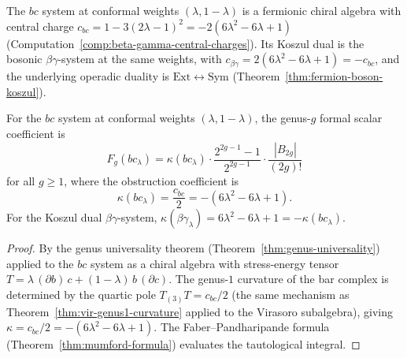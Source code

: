 The $bc$ system at conformal weights $(\lambda, 1-\lambda)$
is a fermionic chiral algebra with central charge
$c_{bc} = 1 - 3(2\lambda-1)^2 = -2(6\lambda^2 - 6\lambda + 1)$
(Computation~\ref{comp:beta-gamma-central-charges}).
Its Koszul dual is the bosonic $\beta\gamma$-system at the same
weights, with $c_{\beta\gamma} = 2(6\lambda^2 - 6\lambda + 1)
= -c_{bc}$, and the underlying operadic duality is
$\mathrm{Ext} \leftrightarrow \mathrm{Sym}$
(Theorem~\ref{thm:fermion-boson-koszul}).

\begin{theorem}\label{thm:fermion-all-genera}

For the $bc$ system at conformal weights $(\lambda, 1-\lambda)$,
the genus-$g$ formal scalar coefficient is
\begin{equation}\label{eq:fermion-Fg-bc}
F_g(bc_\lambda) = \kappa(bc_\lambda) \cdot
\frac{2^{2g-1}-1}{2^{2g-1}} \cdot
\frac{|B_{2g}|}{(2g)!}
\end{equation}
for all $g \geq 1$, where the obstruction coefficient is
\begin{equation}\label{eq:fermion-kappa}
\kappa(bc_\lambda) = \frac{c_{bc}}{2}
= -(6\lambda^2 - 6\lambda + 1).
\end{equation}
For the Koszul dual $\beta\gamma$-system,
$\kappa(\beta\gamma_\lambda) = 6\lambda^2 - 6\lambda + 1
= -\kappa(bc_\lambda)$.
\end{theorem}

\begin{proof}
By the genus universality theorem
(Theorem~\ref{thm:genus-universality}) applied to
the $bc$ system as a chiral algebra with stress-energy tensor
$T = \lambda\,(\partial b)\,c + (1-\lambda)\,b\,(\partial c)$.
The genus-$1$ curvature of the bar complex is determined by
the quartic pole $T_{(3)}T = c_{bc}/2$
(the same mechanism as Theorem~\ref{thm:vir-genus1-curvature}
applied to the Virasoro subalgebra), giving
$\kappa = c_{bc}/2 = -(6\lambda^2 - 6\lambda + 1)$.
The Faber--Pandharipande formula
(Theorem~\ref{thm:mumford-formula}) evaluates the
tautological integral.
\end{proof}

